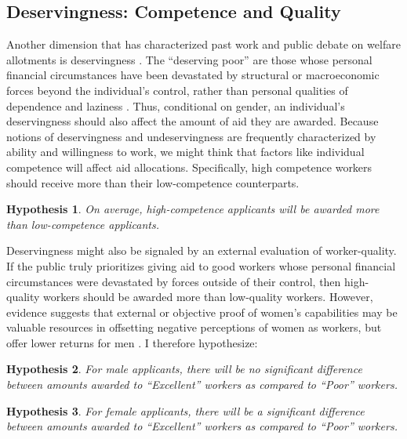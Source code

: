 \documentclass[12pt]{article}%
\newtheorem{hypothesis}{Hypothesis}
\begin{document}
\begin{doublespace}
\subsection*{Deservingness: Competence and Quality}
Another dimension that has characterized past work and public debate on welfare allotments is deservingness \citep{schneider_social_1993}. The ``deserving poor” are those whose personal financial circumstances have been devastated by structural or macroeconomic forces beyond the individual’s control, rather than personal qualities of dependence and laziness \citep{van_oorschot_who_nodate}. Thus, conditional on gender, an individual’s deservingness should also affect the amount of aid they are awarded. Because notions of deservingness and undeservingness are frequently characterized by ability and willingness to work, we might think that factors like individual competence will affect aid allocations. Specifically, high competence workers should receive more than their low-competence counterparts.


\begin{hypothesis} \label{hyp:second}
On average, high-competence applicants will be awarded more than low-competence applicants.
\end{hypothesis}


Deservingness might also be signaled by an external evaluation of worker-quality. If the public truly prioritizes giving aid to good workers whose personal financial circumstances were devastated by forces outside of their control, then high-quality workers should be awarded more than low-quality workers. However, evidence suggests that external or objective proof of women’s capabilities may be valuable resources in offsetting negative perceptions of women as workers, but offer lower returns for men \citep{abel_value_2020, dadgar_labor_2015, jepsen_labor-market_2014}. I therefore hypothesize:


\begin{hypothesis} \label{hyp:thirda}
	For male applicants, there will be no significant difference between amounts awarded to ``Excellent” workers as compared to ``Poor” workers.
\end{hypothesis}

\begin{hypothesis} \label{hyp:thirdb}
	For female applicants, there will be a significant difference between amounts awarded to ``Excellent” workers as compared to ``Poor” workers.
\end{hypothesis}



\end{doublespace}
\end{document}
